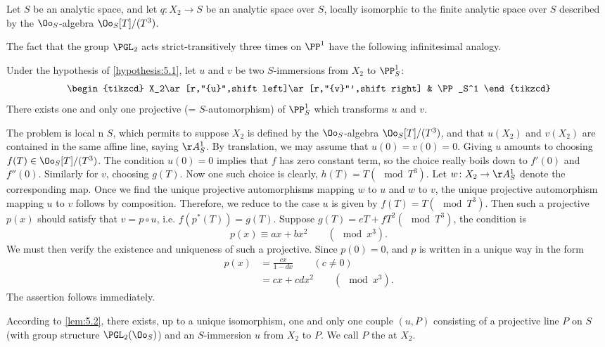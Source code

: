 \begin{para}\label{hypothesis:5.1}
  Let $S$ be an analytic space, and let $q\colon X_2\to S$ be an analytic space
  over $S$, locally isomorphic to the finite analytic space over $S$ described
  by the $\Oo_S$-algebra $\Oo_S[T]/(T^3)$.
\end{para}

  The fact that the group $\PGL_2$ acts strict-transitively three times on
  $\PP^1$ have the following infinitesimal analogy.

\begin{lemma}\label{lem:5.2}
  Under the hypothesis of \ref{hypothesis:5.1}, let $u$ and $v$ be two
  $S$-immersions from $X_2$ to $\PP_S^1$:
  \[
  \begin{tikzcd}
    X_2\ar[r,"{u}",shift left]\ar[r,"{v}"',shift right] & \PP_S^1
  \end{tikzcd}
  \]
  There exists one and only one projective (= $S$-automorphism) of $\PP_S^1$
  which transforms $u$ and $v$.
\end{lemma}

The problem is local n $S$, which permits to suppose $X_2$ is defined by the
$\Oo_S$-algebra $\Oo_S[T]/(T^3)$, and that $u(X_2)$ and $v(X_2)$ are contained
in the same affine line, saying $\AA_S^1$.
By translation, we may assume that $u(0)=v(0)=0$.
Giving $u$ amounts to choosing $f(T)\in\Oo_S[T]/(T^3)$.
The condition $u(0)=0$ implies that $f$ has zero constant term,
so the choice really boils down to $f'(0)$ and $f''(0)$.
Similarly for $v$, choosing $g(T)$.
Now one such choice is clearly, $h(T)=T(\mod T^3)$.
Let $w\colon X_2\to\AA_S^1$ denote the corresponding map.
Once we find the unique projective automorphisms mapping $w$ to $u$ and
$w$ to $v$, the unique projective automorphism mapping $u$ to $v$ follows
by composition.
Therefore, we reduce to the case $u$ is given by $f(T)=T(\mod T^3)$.
Then such a projective $p(x)$ should satisfy that
$v=p\circ u$, i.e. $f(p^\ast(T))=g(T)$.
Suppose $g(T)=eT+fT^2(\mod T^3)$, the condition is
\[
p(x)\equiv ax + bx^2\qquad (\mod{x^3}).
\]
We must then verify the existence and uniqueness of such a projective.
Since $p(0)=0$, and $p$ is written in a unique way in the form
\begin{align*}
  p(x) &= \frac{cx}{1-dx}\qquad(c\neq 0) \\
  &= cx + cdx^2\qquad (\mod{x^3}).
\end{align*}
The assertion follows immediately.

\begin{para}
  According to \ref{lem:5.2}, there exists, up to a unique isomorphism, one and
  only one couple $(u,P)$ consisting of a projective line $P$ on $S$ (with
  group structure $\PGL_2(\Oo_S)$) and an $S$-immersion $u$ from $X_2$ to $P$.
  We call $P$ the  at $X_2$.
\end{para}

